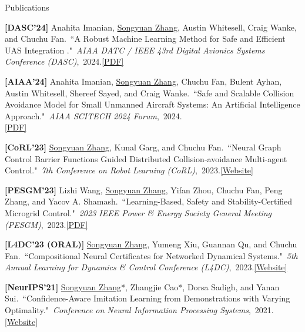 \documentclass{resume} %
\newcommand{\paperItem}[4]{#1.~``#2."~\textit{#3},~#4.}%
\newcommand{\me}{\underline{Songyuan Zhang}}
\newcommand{\meshort}{\textbf{S. Zhang}}
\newcommand{\person}[2]{#1}
\begin{document}
\begin{rSection}{Publications}
{			\item {\bf [DASC'24]}
			\paperItem{\person{Anahita Imanian}{A. Imanian}, \person{\me}{\meshort}, \person{Austin Whitesell}{A. Whitesell}, \person{Craig Wanke}{C. Wanke}, and \person{Chuchu Fan}{C. Fan}}{A Robust Machine Learning Method for Safe and Efficient UAS Integration }{AIAA DATC / IEEE 43rd Digital Avionics Systems Conference (DASC)}{2024}{\href{https://ieeexplore.ieee.org/abstract/document/10749515}{[PDF]}}
			\item {\bf [AIAA'24]}
			\paperItem{\person{Anahita Imanian}{A. Imanian}, \person{\me}{\meshort}, \person{Chuchu Fan}{C. Fan}, \person{Bulent Ayhan}{B. Ayhan}, \person{Austin Whitesell}{A. Whitesell}, \person{Shereef Sayed}{S. Sayed}, and \person{Craig Wanke}{C. Wanke}}{Safe and Scalable Collision Avoidance Model for Small Unmanned Aircraft Systems: An Artificial Intelligence Approach}{AIAA SCITECH 2024 Forum}{2024}\\{\href{https://arc.aiaa.org/doi/abs/10.2514/6.2024-1081}{[PDF]}}
			\item {\bf [CoRL'23]}
			\paperItem{\person{\me}{\meshort}, \person{Kunal Garg}{K. Garg}, and \person{Chuchu Fan}{C. Fan}}{Neural Graph Control Barrier Functions Guided Distributed Collision-avoidance Multi-agent Control}{7th Conference on Robot Learning (CoRL)}{2023}{\href{https://mit-realm.github.io/gcbf-website/}{[Website]}}
			\item {\bf [PESGM'23]}
			\paperItem{\person{Lizhi Wang}{L. Wang}, \person{\me}{\meshort}, \person{Yifan Zhou}{Y. Zhou}, \person{Chuchu Fan}{C. Fan}, \person{Peng Zhang}{P. Zhang}, and \person{Yacov A. Shamash}{YA. Shamash}}{Learning-Based, Safety and Stability-Certified Microgrid Control}{2023 IEEE Power \& Energy Society General Meeting (PESGM)}{2023}{\href{https://ieeexplore.ieee.org/stamp/stamp.jsp?arnumber=10253396}{[PDF]}}
			\item {\bf [L4DC'23 (ORAL)]}
			\paperItem{\person{\me}{\meshort}, \person{Yumeng Xiu}{Y. Xiu}, \person{Guannan Qu}{G. Qu}, and \person{Chuchu Fan}{C. Fan}}{Compositional Neural Certificates for Networked Dynamical Systems}{5th Annual Learning for Dynamics \& Control Conference (L4DC)}{2023}{\href{https://mit-realm.github.io/neuriss-website/}{[Website]}}
			\item {\bf [NeurIPS'21]}
			\paperItem{\person{\me*}{\meshort}, \person{Zhangjie Cao*}{Z. Cao}, \person{Dorsa Sadigh}{D. Sadigh}, and \person{Yanan Sui}{Y. Sui}}{Confidence-Aware Imitation Learning from Demonstrations with Varying Optimality}{Conference on Neural Information Processing Systems}{2021}{\href{https://sites.google.com/view/cail/}{[Website]}}
		}
	\end{rSection}
\end{document}
